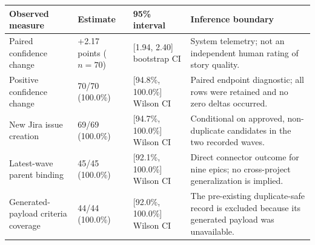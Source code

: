 \begin{tabularx}{\textwidth}{@{}p{}p{}p{}X@{}}
\toprule
Observed measure & Estimate & 95\% interval & Inference boundary \\
\midrule
Paired confidence change & +2.17 points ($n=70$) & [1.94, 2.40] bootstrap CI & System telemetry; not an independent human rating of story quality. \\
Positive confidence change & 70/70 (100.0\%) & [94.8\%, 100.0\%] Wilson CI & Paired endpoint diagnostic; all rows were retained and no zero deltas occurred. \\
New Jira issue creation & 69/69 (100.0\%) & [94.7\%, 100.0\%] Wilson CI & Conditional on approved, non-duplicate candidates in the two recorded waves. \\
Latest-wave parent binding & 45/45 (100.0\%) & [92.1\%, 100.0\%] Wilson CI & Direct connector outcome for nine epics; no cross-project generalization is implied. \\
Generated-payload criteria coverage & 44/44 (100.0\%) & [92.0\%, 100.0\%] Wilson CI & The pre-existing duplicate-safe record is excluded because its generated payload was unavailable. \\
\bottomrule
\end{tabularx}
